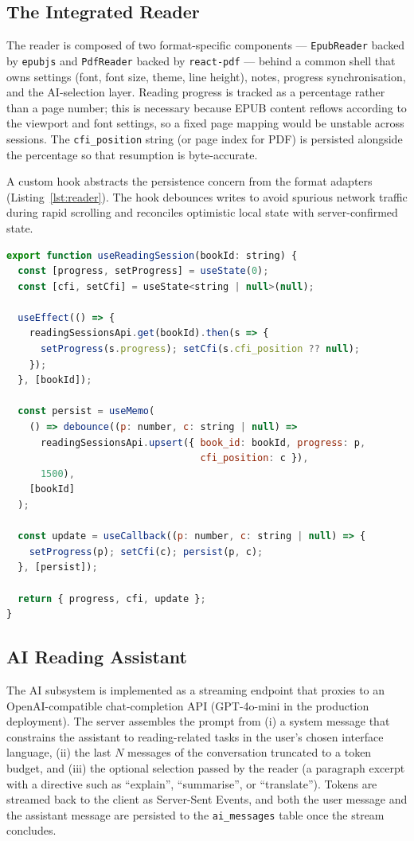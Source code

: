 \documentclass[12pt,a4paper]{report}
\begin{document}
\subsection{The Integrated Reader}

The reader is composed of two format-specific components ---
\texttt{EpubReader} backed by \texttt{epubjs} and \texttt{PdfReader}
backed by \texttt{react-pdf} --- behind a common shell that owns settings
(font, font size, theme, line height), notes, progress synchronisation,
and the AI-selection layer. Reading progress is tracked as a percentage
rather than a page number; this is necessary because EPUB content reflows
according to the viewport and font settings, so a fixed page mapping
would be unstable across sessions. The \texttt{cfi\_position} string (or
page index for PDF) is persisted alongside the percentage so that
resumption is byte-accurate.

A custom hook abstracts the persistence concern from the format adapters
(Listing~\ref{lst:reader}). The hook debounces writes to avoid spurious
network traffic during rapid scrolling and reconciles optimistic local
state with server-confirmed state.

\begin{lstlisting}[language=JavaScript,caption={\texttt{useReadingSession} hook (excerpt).},label=lst:reader]
export function useReadingSession(bookId: string) {
  const [progress, setProgress] = useState(0);
  const [cfi, setCfi] = useState<string | null>(null);

  useEffect(() => {
    readingSessionsApi.get(bookId).then(s => {
      setProgress(s.progress); setCfi(s.cfi_position ?? null);
    });
  }, [bookId]);

  const persist = useMemo(
    () => debounce((p: number, c: string | null) =>
      readingSessionsApi.upsert({ book_id: bookId, progress: p,
                                  cfi_position: c }),
      1500),
    [bookId]
  );

  const update = useCallback((p: number, c: string | null) => {
    setProgress(p); setCfi(c); persist(p, c);
  }, [persist]);

  return { progress, cfi, update };
}
\end{lstlisting}

\subsection{AI Reading Assistant}

The AI subsystem is implemented as a streaming endpoint that proxies to
an OpenAI-compatible chat-completion API (GPT-4o-mini in the production
deployment). The server assembles the prompt from (i) a system message
that constrains the assistant to reading-related tasks in the user's
chosen interface language, (ii) the last $N$ messages of the
conversation truncated to a token budget, and (iii) the optional
selection passed by the reader (a paragraph excerpt with a directive
such as ``explain'', ``summarise'', or ``translate''). Tokens are
streamed back to the client as Server-Sent Events, and both the user
message and the assistant message are persisted to the
\texttt{ai\_messages} table once the stream concludes.
\end{document}
